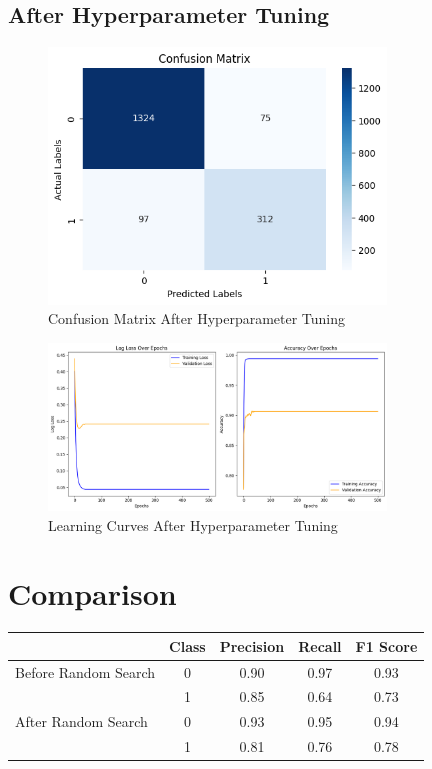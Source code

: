 \documentclass{article}
\begin{document}
\subsection*{After Hyperparameter Tuning}
\begin{figure}[H]
    \centering
    \includegraphics[width=0.8\textwidth]{plots/xgbconf_after.png}
    \caption{Confusion Matrix After Hyperparameter Tuning}
    \label{fig:class_conf_after}
\end{figure}
\begin{figure}[H]
    \centering
    \includegraphics[width=0.8\textwidth]{plots/xgb_learning_after.png}
    \caption{Learning Curves After Hyperparameter Tuning}
    \label{fig:class_learn_after}
\end{figure}

\section*{Comparison}
\begin{tabular}{|l|c|c|c|c|}
\hline
\textbf{} & \textbf{Class} & \textbf{Precision} & \textbf{Recall} & \textbf{F1 Score} \\
\hline
Before Random Search & 0 & 0.90 & 0.97 & 0.93\\
 & 1 & 0.85 & 0.64 & 0.73\\
\hline
After Random Search & 0 & 0.93 & 0.95 & 0.94\\
 & 1 & 0.81 & 0.76 & 0.78\\
\hline
\end{tabular}
\end{document}
